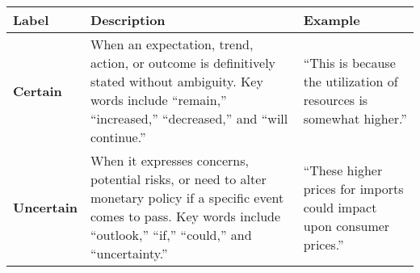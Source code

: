 \begin{table*}
    \caption{}
    \vspace{1em}
    \begin{tabular}{p{}p{}p{}}
    \toprule
    \textbf{Label} & \textbf{Description} & \textbf{Example}\\
    \midrule
    \textbf{Certain} & When an expectation, trend, action, or outcome is definitively stated without ambiguity. Key words include ``remain,'' ``increased,'' ``decreased,'' and ``will continue.''
     & “This is because the utilization of resources is somewhat higher.” \\
    \midrule
    \textbf{Uncertain} & When it expresses concerns, potential risks, or
    need to alter monetary policy if a specific event comes to pass. Key words include ``outlook,'' ``if,'' ``could,'' and ``uncertainty.'' & “These higher prices for imports could impact upon consumer prices.” \\
    \bottomrule
    \end{tabular}
    \label{tb:fomc_certainty_guide}
    \end{table*}